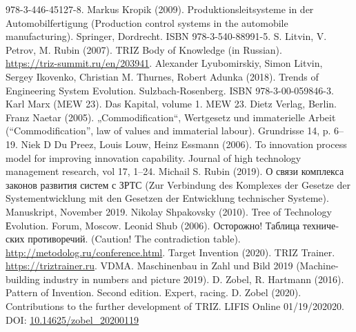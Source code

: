\documentclass{llncs}
\begin{document}
\begin{thebibliography}{xxx}
  978-3-446-45127-8.
 Markus Kropik (2009). Produktionsleitsysteme in der
  Automobilfertigung (Production control systems in the automobile
  manufacturing). Springer, Dordrecht. ISBN 978-3-540-88991-5.
 S. Litvin, V. Petrov, M. Rubin (2007). TRIZ Body of
  Knowledge (in Russian). \\ \url{https://triz-summit.ru/en/203941}.
 Alexander Lyubomirskiy, Simon Litvin, Sergey Ikovenko,
  Christian M. Thurnes, Robert Adunka (2018). Trends of Engineering System
  Evolution. Sulzbach-Rosenberg. ISBN 978-3-00-059846-3.
 Karl Marx (MEW 23). Das Kapital, volume 1. MEW 23. Dietz
  Verlag, Berlin.
 Franz Naetar (2005). „Commodification“, Wertgesetz und
  immaterielle Arbeit (``Commodification'', law of values and immaterial
  labour). Grundrisse 14, p. 6--19.
 Niek D Du Preez, Louis Louw, Heinz Essmann (2006). To
  innovation process model for improving innovation capability. Journal of
  high technology management research, vol 17, 1--24.
 Michail S. Rubin (2019).  \foreignlanguage{russian}{О
  связи комплекса законов развития систем с ЗРТС} (Zur Verbindung des
  Komplexes der Gesetze der Systementwicklung mit den Gesetzen der Entwicklung
  technischer Systeme). Manuskript, November 2019.
 Nikolay Shpakovsky (2010). Tree of Technology
  Еvolution. Forum, Moscow.
 Leonid Shub (2006). \foreignlanguage{russian}{Осторожно!
  Таблица технических противоречий}. (Caution! The contradiction table).
  \url{http://metodolog.ru/conference.html}. 
 Target Invention (2020). TRIZ Trainer.
  \url{https://triztrainer.ru}.
 VDMA. Maschinenbau in Zahl und Bild 2019 (Machine-building
  industry in numbers and picture 2019).
 D. Zobel, R. Hartmann (2016). Pattern of Invention.
  Second edition. Expert, racing.
 D. Zobel (2020). Contributions to the further development
  of TRIZ.  LIFIS Online 01/19/202020. DOI: \url{10.14625/zobel_20200119}
\end{thebibliography}
\end{document}

